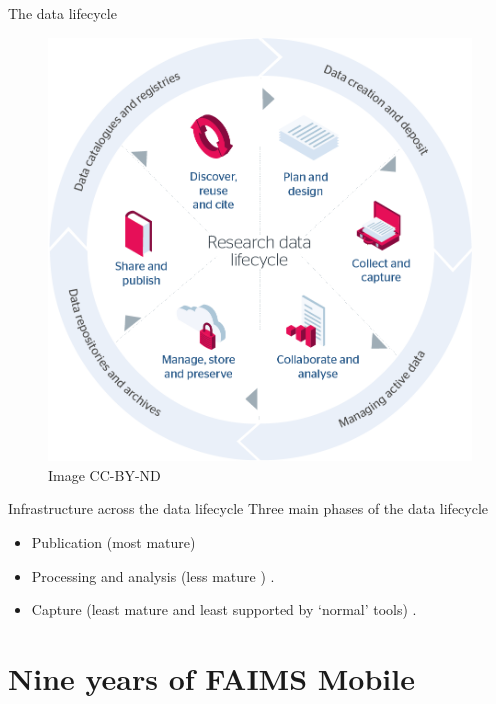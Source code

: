 \documentclass[aspectratio=169, 12pt]{beamer} %
\begin{document}
\begin{frame}{The data lifecycle}
 \begin{figure}[H]
    \centering
        \includegraphics[height=.75\textheight]{figures/research-data-life-diagram.png}
        \caption{\cite{Jisc2018-gx} Image CC-BY-ND}
        \label{fig:figure9}
 \end{figure}
\end{frame}

\begin{frame}{Infrastructure across the data lifecycle}
    Three main phases of the data lifecycle
    \begin{itemize}[label=\textbullet]
        \item Publication (most mature)
        \item Processing and analysis (less mature ) \cite{Stewart_Lowndes2017-lj} \cite{Alveo2019-tk}.
        \item Capture (least mature and least supported by `normal' tools) \cite{Bureau_of_Reclamation2017-xl}.
    \end{itemize}
\end{frame}


\section{Nine years of FAIMS Mobile}
\end{document}
